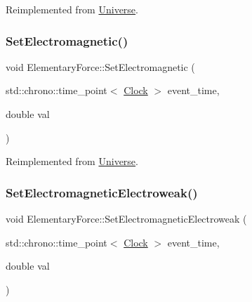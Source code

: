 Reimplemented from \mbox{\hyperlink{classUniverse_aa22202ae740eb1355529afcb13285e91}{Universe}}.

\mbox{\label{classElementaryForce_a67f6845bd715c29c17387d291b343a1b}} 
\subsubsection{\texorpdfstring{Set\+Electromagnetic()}{SetElectromagnetic()}}
{\footnotesize\ttfamily void Elementary\+Force\+::\+Set\+Electromagnetic (\begin{DoxyParamCaption}\item[{std\+::chrono\+::time\+\_\+point$<$ \mbox{\hyperlink{universe_8h_a0ef8d951d1ca5ab3cfaf7ab4c7a6fd80}{Clock}} $>$}]{event\+\_\+time,  }\item[{double}]{val }\end{DoxyParamCaption})\hspace{0.3cm}{\ttfamily [virtual]}}



Reimplemented from \mbox{\hyperlink{classUniverse_aa981fc7e252b1fbbb675f0371860954d}{Universe}}.

\mbox{\label{classElementaryForce_af4f12038c33d7edf9f13339fcd632ec9}} 
\subsubsection{\texorpdfstring{Set\+Electromagnetic\+Electroweak()}{SetElectromagneticElectroweak()}}
{\footnotesize\ttfamily void Elementary\+Force\+::\+Set\+Electromagnetic\+Electroweak (\begin{DoxyParamCaption}\item[{std\+::chrono\+::time\+\_\+point$<$ \mbox{\hyperlink{universe_8h_a0ef8d951d1ca5ab3cfaf7ab4c7a6fd80}{Clock}} $>$}]{event\+\_\+time,  }\item[{double}]{val }\end{DoxyParamCaption})\hspace{0.3cm}{\ttfamily [virtual]}}



